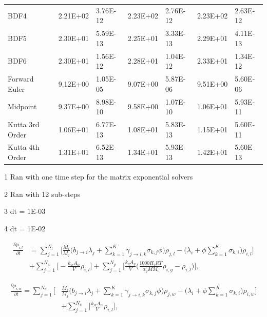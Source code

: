 \begin{table}[p]
\begin{adjustbox}{width=1\textwidth}
\begin{threeparttable}
\begin{tabular}{lllllll}
	BDF4\tnote{3} & 2.21E+02 & 3.76E-12 & 2.23E+02 & 2.76E-12 & 2.23E+02 & 2.63E-12 \\
	BDF5\tnote{4} & 2.30E+01 & 5.59E-13 & 2.25E+01 & 3.33E-13 & 2.29E+01 & 4.11E-13 \\
	BDF6\tnote{4} & 2.30E+01 & 1.56E-12 & 2.28E+01 & 1.04E-12 & 2.33E+01 & 1.34E-12 \\
	Forward Euler\tnote{3} & 9.12E+00 & 1.05E-05 & 9.07E+00 & 5.87E-06 & 9.51E+00 & 5.60E-06 \\
	Midpoint\tnote{3} & 9.37E+00 & 8.98E-10 & 9.58E+00 & 1.07E-10 & 1.06E+01 & 5.93E-11 \\
	Kutta 3rd Order\tnote{3} & 1.06E+01 & 6.77E-13 & 1.08E+01 & 5.83E-13 & 1.15E+01 & 5.60E-11 \\
	Kutta 4th Order\tnote{3} & 1.31E+01 & 6.52E-13 & 1.34E+01 & 5.93E-13 & 1.42E+01 & 5.60E-13 \\
   \hline
   \end{tabular}
	\begin{tablenotes}
      \small
      \item [1] Ran with one time step for the matrix exponential solvers
      \item [2] Ran with 12 sub-steps
      \item [3] dt = 1E-03
      \item [4] dt = 1E-02
    \end{tablenotes}
\end{threeparttable}
\end{adjustbox}
\end{table} 

\clearpage


\begin{equation}
\begin{split}
    \frac{\partial \rho_{i,l}}{\partial t}
    &=
    \sum_{j=1}^{N_{l}}\bigg[\frac{M_{i}}{M_{j}}\bigg(b_{j\rightarrow i}\lambda_{j} + 
    \sum_{k=1}^{K}\gamma_{j\rightarrow i,k}\sigma_{k,j}\phi \bigg)\rho_{j,l}
    - \bigg(\lambda_{i} + \phi\sum_{k=1}^{K} \sigma_{k,i}\bigg)\rho_{i, l} \bigg]\\ &+ \sum_{j=1}^{N_{w}} \bigg[-\frac{k_{w}A_{w}}{V}\rho_{i,l} \bigg] + \sum_{j=1}^{N_{g}} \bigg[  \frac{k_{g}A_{g}}{V}\bigg(\frac{1000H_{i}RT}{\alpha_{g}MM_{i}}\rho_{i, g} - \rho_{i,l}\bigg) \bigg],
    \label{eq:MSRLumpDepletionSmallLiquidPhase}
\end{split}
\end{equation}

\begin{equation}
\begin{split}
    \frac{\partial \rho_{i,w}}{\partial t} = \sum_{j=1}^{N_{w}}\bigg[&\frac{M_{i}}{M_{j}}\bigg(b_{j\rightarrow i}\lambda_{j} + 
    \sum_{k=1}^{K}\gamma_{j\rightarrow i,k}\sigma_{k,j}\phi \bigg)\rho_{j, w}
    - \bigg(\lambda_{i} + \phi\sum_{k=1}^{K} \sigma_{k,i}\bigg)\rho_{i, w} \bigg]\\ &+ \sum_{j=1}^{N_{w}} \bigg[\frac{k_{w}A_{w}}{V}\rho_{i,l} \bigg],
    \label{eq:MSRLumpDepletionSmallWallPhase}
\end{split}
\end{equation}

